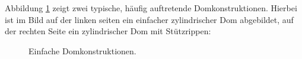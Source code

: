 Abbildung \ref{im:domes1} zeigt zwei typische, h\"aufig auftretende Domkonstruktionen. Hierbei ist im Bild auf der linken seiten ein einfacher zylindrischer Dom abgebildet, auf der rechten Seite ein zylindrischer Dom mit St\"utzrippen:

\begin{figure}[ht]
    \centering 
\caption{Einfache Domkonstruktionen.} 
\label{im:domes1}
\end{figure} 


